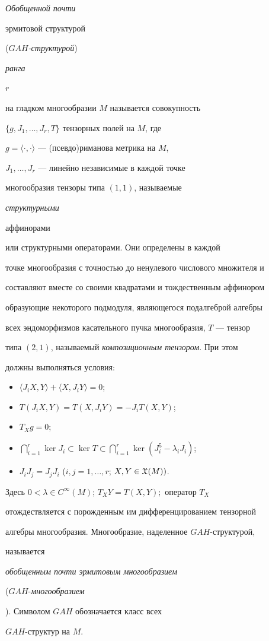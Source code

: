 \begin{defn}


{\it Обобщенной почти


эрмитовой структурой} ({\it $GAH$-струк\-ту\-рой}) {\it ранга


$r$} на гладком многообразии $M$ называется совокупность


$\{g,J_1,\dotsc,J_r,T\}$ тензорных полей на $M$, где


$g=\langle\cdot,\cdot\rangle$ --- (псевдо)риманова метрика на $M$,


$J_1,\dotsc,J_r$ --- линейно независимые в каждой точке


многообразия тензоры типа $(1,1)$, называемые {\it структурными


аффинорами} или структурными операторами. Они определены в каждой


точке многообразия с точностью до ненулевого числового множителя и


составляют вместе со своими квадратами и тождественным аффинором


образующие некоторого подмодуля, являющегося подалгеброй алгебры


всех эндоморфизмов касательного пучка многообразия, $T$ --- тензор


типа $(2,1)$, называемый {\it композиционным тензором}. При этом


должны выполняться условия:


\begin{itemize}


\item[1.] $\langle J_iX,Y\rangle + \langle X,J_iY\rangle=0$;


\item[2.] $T(J_iX,Y)=T(X,J_iY)=-J_iT(X,Y)$;


\item[3.] $T_Xg=0$;


\item[4.] $\bigcap\limits_{i=1}^r \ker J_i\subset \ker T\subset


\bigcap\limits_{i=1}^r \ker(J_i^5-\lambda_i J_i)$;


\item[5.] $J_i J_j=J_j J_i$ ($i,j=1,\dotsc,r$; $X,Y\in \frak{X}(M))$.


\end{itemize}


Здесь $0<\lambda\in C^\infty(M)$; $T_X Y=T(X,Y);$ оператор $T_X$


отождествляется с порожденным им дифференцированием тензорной


алгебры многообразия. Многообразие, наделенное $GAH$-структурой,


называется {\it обобщенным почти эрмитовым многообразием 


($GAH$-\it многообразием}). Символом $GAH$ обозначается класс всех


$GAH$-структур на $M$.


\end{defn}





